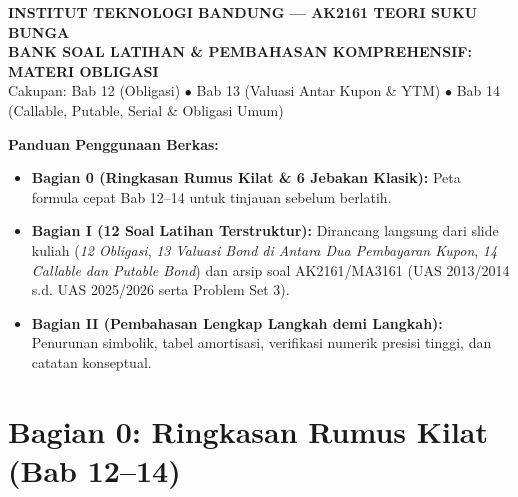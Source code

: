 \documentclass[11pt,a4paper]{article}
\begin{document}
\begin{tcolorbox}[
    enhanced,
    colback=primaryblue,
    colframe=primaryblue,
    arc=2mm,
    left=4mm,right=4mm,top=3.5mm,bottom=3.5mm,
    boxrule=0pt
]
\begin{center}
    {\fontsize{15}{18}\selectfont\bfseries\color{white} INSTITUT TEKNOLOGI BANDUNG --- AK2161 TEORI SUKU BUNGA}\\[1.2mm]
    {\fontsize{13}{16}\selectfont\bfseries\color{amberbg} BANK SOAL LATIHAN \& PEMBAHASAN KOMPREHENSIF: MATERI OBLIGASI}\\[1.2mm]
    {\fontsize{9.5}{12}\selectfont\color{white} Cakupan: Bab 12 (Obligasi) $\bullet$ Bab 13 (Valuasi Antar Kupon \& YTM) $\bullet$ Bab 14 (Callable, Putable, Serial \& Obligasi Umum)}
\end{center}
\end{tcolorbox}

\begin{tcolorbox}[
    enhanced,
    colback=boxbg,
    colframe=secondaryblue,
    arc=1.5mm,
    boxrule=0.6pt,
    left=3mm,right=3mm,top=2mm,bottom=2mm
]
\small
\textbf{Panduan Penggunaan Berkas:}
\begin{itemize}[leftmargin=5mm, topsep=1pt, itemsep=1pt]
    \item \textbf{Bagian 0 (Ringkasan Rumus Kilat \& 6 Jebakan Klasik):} Peta formula cepat Bab 12--14 untuk tinjauan sebelum berlatih.
    \item \textbf{Bagian I (12 Soal Latihan Terstruktur):} Dirancang langsung dari slide kuliah (\textit{12 Obligasi}, \textit{13 Valuasi Bond di Antara Dua Pembayaran Kupon}, \textit{14 Callable dan Putable Bond}) dan arsip soal AK2161/MA3161 (UAS 2013/2014 s.d. UAS 2025/2026 serta Problem Set 3).
    \item \textbf{Bagian II (Pembahasan Lengkap Langkah demi Langkah):} Penurunan simbolik, tabel amortisasi, verifikasi numerik presisi tinggi, dan catatan konseptual.
\end{itemize}
\end{tcolorbox}

\section*{\color{primaryblue} Bagian 0: Ringkasan Rumus Kilat (Bab 12--14)}
\end{document}
